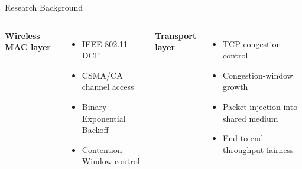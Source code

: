 \begin{frame}{Research Background}


\vspace{0.35cm}

\begin{columns}[T,onlytextwidth]
\textbf{Wireless MAC layer}
\begin{itemize}
    \item IEEE 802.11 DCF
    \item CSMA/CA channel access
    \item Binary Exponential Backoff
    \item Contention Window control
\end{itemize}

\textbf{Transport layer}
\begin{itemize}
    \item TCP congestion control
    \item Congestion-window growth
    \item Packet injection into shared medium
    \item End-to-end throughput fairness
\end{itemize}
\end{columns}
\end{frame}
